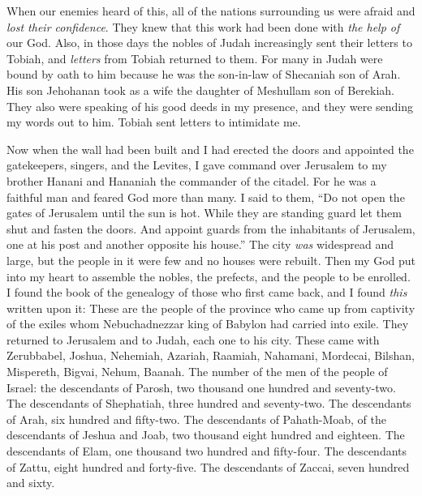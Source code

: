 \begin{biblechapter}
\verse When our enemies heard of this, all of the nations surrounding us were afraid and \textit{lost their confidence}. They knew that this work had been done with \textit{the help of} our God.
\verse Also, in those days the nobles of Judah increasingly sent their letters to Tobiah, and \textit{letters} from Tobiah returned to them.
\verse For many in Judah were bound by oath to him because he was the son-in-law of Shecaniah son of Arah. His son Jehohanan took as a wife the daughter of Meshullam son of Berekiah.
\verse They also were speaking of his good deeds in my presence, and they were sending my words out to him. Tobiah sent letters to intimidate me.
\end{biblechapter}

\begin{biblechapter} %
\verse Now when the wall had been built and I had erected the doors and appointed the gatekeepers, singers, and the Levites,
\verse I gave command over Jerusalem to my brother Hanani and Hananiah the commander of the citadel. For he was a faithful man and feared God more than many.
\verse I said to them, “Do not open the gates of Jerusalem until the sun is hot. While they are standing guard let them shut and fasten the doors. And appoint guards from the inhabitants of Jerusalem, one at his post and another opposite his house.”
\verse The city \textit{was} widespread and large, but the people in it were few and no houses were rebuilt.
 Then my God put into my heart to assemble the nobles, the prefects, and the people to be enrolled. I found the book of the genealogy of those who first came back, and I found \textit{this} written upon it:
\verse These are the people of the province who came up from captivity of the exiles whom Nebuchadnezzar king of Babylon had carried into exile. They returned to Jerusalem and to Judah, each one to his city.
\verse These came with Zerubbabel, Joshua, Nehemiah, Azariah, Raamiah, Nahamani, Mordecai, Bilshan, Mispereth, Bigvai, Nehum, Baanah.
\verse The number of the men of the people of Israel:
\verse the descendants of Parosh, two thousand one hundred and seventy-two.
\verse The descendants of Shephatiah, three hundred and seventy-two.
\verse The descendants of Arah, six hundred and fifty-two.
\verse The descendants of Pahath-Moab, of the descendants of Jeshua and Joab, two thousand eight hundred and eighteen.
\verse The descendants of Elam, one thousand two hundred and fifty-four.
\verse The descendants of Zattu, eight hundred and forty-five.
\verse The descendants of Zaccai, seven hundred and sixty.

\end{biblechapter}
